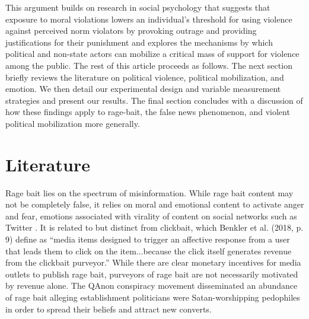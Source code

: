 This argument builds on research in social psychology that suggests that exposure to moral violations lowers an individual's threshold for using violence against perceived norm violators by provoking outrage and providing justifications for their punishment \citep{baumeister1999evil,beck1999prisoners,crockett2017moral, fiske2014virtuous, goldberg1999rage} and explores the mechanisms by which political and non-state actors can mobilize a critical mass of support for violence among the public. The rest of this article proceeds as follows. The next section briefly reviews the literature on political violence, political mobilization, and emotion. We then detail our experimental design and variable measurement strategies and present our results. The final section concludes with a discussion of how these findings apply to rage-bait, the false news phenomenon, and violent political mobilization more generally.

\section{Literature}

Rage bait lies on the spectrum of misinformation. While rage bait content may not be completely false, it relies on moral and emotional content to activate anger and fear, emotions associated with virality of content on social networks such as Twitter \citep{brady2017emotion}. It is related to but distinct from clickbait, which Benkler et al. (2018, p. 9) define as ``media items designed to trigger an affective response from a user that leads them to click on the item...because the click itself generates revenue from the clickbait purveyor.'' While there are clear monetary incentives for media outlets to publish rage bait, purveyors of rage bait are not necessarily motivated by revenue alone. The QAnon conspiracy movement disseminated an abundance of rage bait alleging establishment politicians were Satan-worshipping pedophiles in order to spread their beliefs and attract new converts. 

